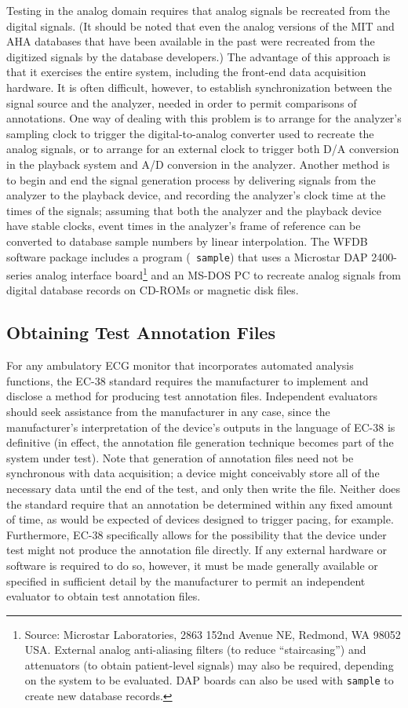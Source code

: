\documentclass[twoside]{article}
\begin{document}
Testing in the analog domain requires that analog signals be recreated from
the digital signals.  (It should be noted that even the analog versions of the
MIT and AHA databases that have been available in the past were recreated
from the digitized signals by the database developers.)  The advantage of this
approach is that it exercises the entire system, including the front-end data
acquisition hardware.  It is often difficult, however, to establish
synchronization between the signal source and the analyzer, needed in order to
permit comparisons of annotations.  One way of dealing with this problem is to
arrange for the analyzer's sampling clock to trigger the digital-to-analog
converter used to recreate the analog signals, or to arrange for an external
clock to trigger both D/A conversion in the playback system and A/D conversion
in the analyzer.  Another method is to begin and end the signal generation
process by delivering signals from the analyzer to the playback device, and
recording the analyzer's clock time at the times of the signals; assuming that
both the analyzer and the playback device have stable clocks, event times in
the analyzer's frame of reference can be converted to database sample numbers
by linear interpolation.  The WFDB software package includes a program ({\tt
sample}) that uses a Microstar DAP 2400-series analog interface
board\footnote{
Source: Microstar Laboratories, 2863 152nd Avenue NE, Redmond,
WA 98052 USA.  External analog anti-aliasing filters (to reduce
``staircasing'') and attenuators (to obtain patient-level signals) may also be
required, depending on the system to be evaluated.  DAP boards can also be
used with {\tt sample} to create new database records.}
and an MS-DOS PC to recreate analog signals from digital database records on
CD-ROMs or magnetic disk files.

\subsection{Obtaining Test Annotation Files}
For any ambulatory ECG monitor that incorporates automated analysis functions,
the EC-38 standard requires the manufacturer to implement and disclose a
method for producing test annotation files.  Independent evaluators should seek
assistance from the manufacturer in any case, since the manufacturer's
interpretation of the device's outputs in the language of EC-38 is definitive
(in effect, the annotation file generation technique becomes part of
the system under test).  Note that generation of annotation files need not be
synchronous with data acquisition; a device might conceivably store all of the
necessary data until the end of the test, and only then write the file.
Neither does the standard require that an annotation be determined within any
fixed amount of time, as would be expected of devices designed to trigger
pacing, for example.  Furthermore, EC-38 specifically allows for the
possibility that the device under test might not produce the annotation file
directly.  If any external hardware or software is required to do so, however,
it must be made generally available or specified in sufficient detail by the
manufacturer to permit an independent evaluator to obtain test annotation
files.
\end{document}
